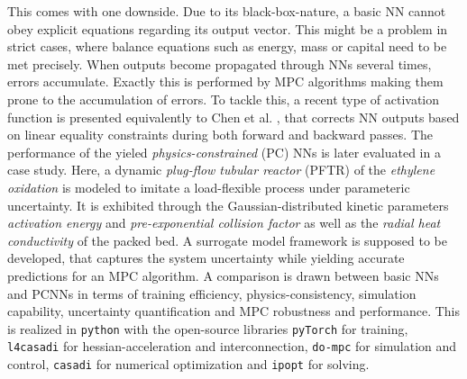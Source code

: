 This comes with one downside.
\newline
\newline
\noindent
Due to its black-box-nature, a basic NN cannot obey explicit equations regarding its output vector.
This might be a problem in strict cases, where balance equations such as energy, mass or capital need to be met precisely.
When outputs become propagated through NNs several times, errors accumulate. Exactly this is performed
by MPC algorithms making them prone to the accumulation of errors. To tackle this, a recent type of
activation function is presented equivalently to Chen et al. \cite{chen2024}, that corrects NN outputs based on
linear equality constraints during both forward and backward passes.
\newline
\newline
\noindent
The performance of the yieled \emph{physics-constrained} (PC) NNs is later evaluated in a case study.
Here, a dynamic \emph{plug-flow tubular reactor} (PFTR) of the \emph{ethylene oxidation} is modeled to
imitate a load-flexible process under parameteric uncertainty. It is exhibited through the Gaussian-distributed
kinetic parameters \emph{activation energy} and \emph{pre-exponential collision factor} as well as the \emph{radial heat conductivity}
of the packed bed. A surrogate model framework is supposed to be developed, that 
captures the system uncertainty while yielding accurate predictions for an MPC algorithm. A comparison
is drawn between basic NNs and PCNNs in terms of training efficiency,
physics-consistency, simulation capability, uncertainty quantification and MPC robustness and performance.
This is realized in \texttt{python} with the open-source libraries \texttt{pyTorch} \cite{pytorch2019} for
training, \texttt{l4casadi} \cite{salzmann2023} for hessian-acceleration and interconnection,
\texttt{do-mpc} \cite{dompc} for simulation and control, \texttt{casadi} \cite{casadi}
for numerical optimization and \texttt{ipopt} \cite{Waechter2006} for solving.

